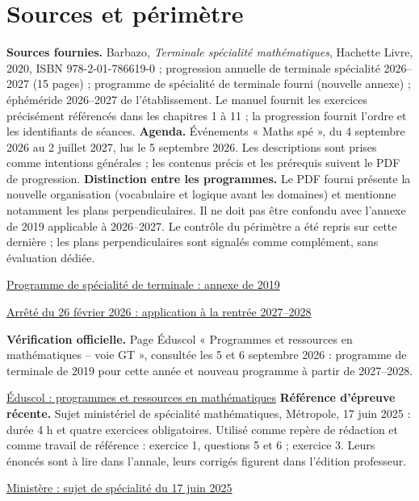 \chapter{Sources et périmètre}
\textbf{Sources fournies.} Barbazo, \emph{Terminale spécialité mathématiques}, Hachette Livre, 2020, ISBN 978-2-01-786619-0 ; progression annuelle de terminale spécialité 2026--2027 (15 pages) ; programme de spécialité de terminale fourni (nouvelle annexe) ; éphéméride 2026--2027 de l'établissement. Le manuel fournit les exercices précisément référencés dans les chapitres 1 à 11 ; la progression fournit l'ordre et les identifiants de séances.
\textbf{Agenda.} Événements « Maths spé », du 4 septembre 2026 au 2 juillet 2027, lus le 5 septembre 2026. Les descriptions sont prises comme intentions générales ; les contenus précis et les prérequis suivent le PDF de progression.
\textbf{Distinction entre les programmes.} Le PDF fourni présente la nouvelle organisation (vocabulaire et logique avant les domaines) et mentionne notamment les plans perpendiculaires. Il ne doit pas être confondu avec l'annexe de 2019 applicable à 2026--2027. Le contrôle du périmètre a été repris sur cette dernière ; les plans perpendiculaires sont signalés comme complément, sans évaluation dédiée.\par
\href{https://eduscol.education.gouv.fr/sites/default/files/document/spe246annexe1158907pdf-84159.pdf}{Programme de spécialité de terminale : annexe de 2019}\par
\href{https://www.education.gouv.fr/bo/2026/Hebdo14/MENE2602919A}{Arrêté du 26 février 2026 : application à la rentrée 2027--2028}\par
\textbf{Vérification officielle.} Page Éduscol « Programmes et ressources en mathématiques -- voie GT », consultée les 5 et 6 septembre 2026 : programme de terminale de 2019 pour cette année et nouveau programme à partir de 2027--2028.\par
\href{https://eduscol.education.gouv.fr/5817/programmes-et-ressources-en-mathematiques-voie-gt}{Éduscol : programmes et ressources en mathématiques}
\textbf{Référence d'épreuve récente.} Sujet ministériel de spécialité mathématiques, Métropole, 17 juin 2025 : durée 4 h et quatre exercices obligatoires. Utilisé comme repère de rédaction et comme travail de référence : exercice 1, questions 5 et 6 ; exercice 3. Leurs énoncés sont à lire dans l'annale, leurs corrigés figurent dans l'édition professeur.\par
\href{https://www.education.gouv.fr/sites/default/files/2025-06/baccalaur-at-g-n-ral-2025-math-matiques-440856.pdf}{Ministère : sujet de spécialité du 17 juin 2025}
